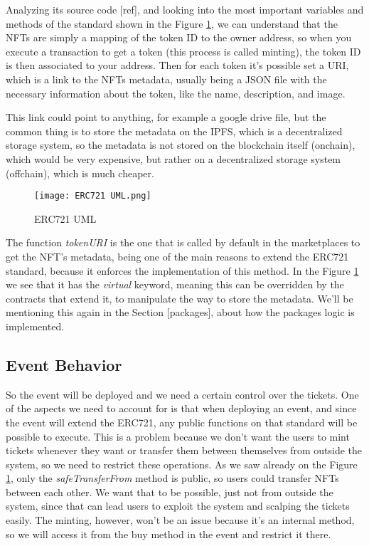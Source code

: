 Analyzing its source code [ref], and looking into the most important variables and methods of the standard shown in the Figure \ref{fig:erc721_uml}, we can understand that the NFTs are simply a mapping of the token ID to the owner address, so when you execute a transaction to get a token (this process is called minting), the token ID is then associated to your address. Then for each token it's possible set a URI, which is a link to the NFTs metadata, usually being a JSON file with the necessary information about the token, like the name, description, and image.

This link could point to anything, for example a google drive file, but the common thing is to store the metadata on the IPFS, which is a decentralized storage system, so the metadata is not stored on the blockchain itself (onchain), which would be very expensive, but rather on a decentralized storage system (offchain), which is much cheaper.

\begin{figure}[H]
    \texttt{[image: ERC721 UML.png]}
    \centering
    \caption{ERC721 UML}
    \label{fig:erc721_uml}
\end{figure}

The function \textit{tokenURI} is the one that is called by default in the marketplaces to get the NFT's metadata, being one of the main reasons to extend the ERC721 standard, because it enforces the implementation of this method. In the Figure \ref{fig:erc721_uml} we see that it has the \textit{virtual} keyword, meaning this can be overridden by the contracts that extend it, to manipulate the way to store the metadata. We'll be mentioning this again in the Section [packages], about how the packages logic is implemented.

\subsection{Event Behavior}
\label{subsec:event_behavior}

So the event will be deployed and we need a certain control over the tickets. One of the aspects we need to account for is that when deploying an event, and since the event will extend the ERC721, any public functions on that standard will be possible to execute. This is a problem because we don't want the users to mint tickets whenever they want or transfer them between themselves from outside the system, so we need to restrict these operations. As we saw already on the Figure \ref{fig:erc721_uml}, only the \textit{safeTransferFrom} method is public, so users could transfer NFTs between each other. We want that to be possible, just not from outside the system, since that can lead users to exploit the system and scalping the tickets easily. The minting, however, won't be an issue because it's an internal method, so we will access it from the buy method in the event and restrict it there.

